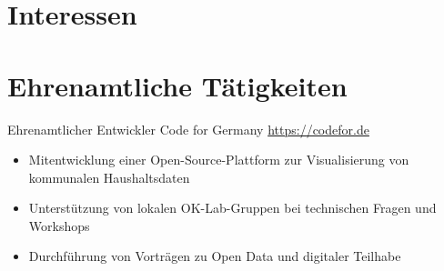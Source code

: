 \documentclass[a4paper, serif, 10pt]{moderncv}
\begin{document}
\section{Interessen}

\section{Ehrenamtliche Tätigkeiten}

        {Ehrenamtlicher Entwickler}
        {Code for Germany}
        {\url{https://codefor.de}}
        {}
        {\begin{itemize}
\item Mitentwicklung einer Open-Source-Plattform zur Visualisierung von kommunalen Haushaltsdaten
\item Unterstützung von lokalen OK-Lab-Gruppen bei technischen Fragen und Workshops
\item Durchführung von Vorträgen zu Open Data und digitaler Teilhabe
\end{itemize}}
\end{document}
